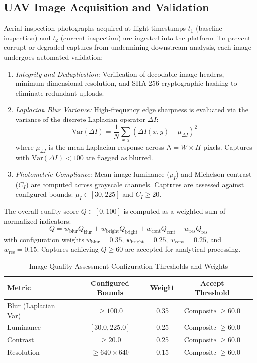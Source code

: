 \documentclass[conference]{IEEEtran}
\begin{document}
\subsection{UAV Image Acquisition and Validation}
Aerial inspection photographs acquired at flight timestamps $t_1$ (baseline inspection) and $t_2$ (current inspection) are ingested into the platform. To prevent corrupt or degraded captures from undermining downstream analysis, each image undergoes automated validation:
\begin{enumerate}
    \item \textit{Integrity and Deduplication:} Verification of decodable image headers, minimum dimensional resolution, and SHA-256 cryptographic hashing to eliminate redundant uploads.
    \item \textit{Laplacian Blur Variance:} High-frequency edge sharpness is evaluated via the variance of the discrete Laplacian operator $\Delta I$:
    \begin{equation}
        \text{Var}(\Delta I) = \frac{1}{N} \sum_{x,y} \left( \Delta I(x,y) - \mu_{\Delta I} \right)^2
        \label{eq:blur}
    \end{equation}
    where $\mu_{\Delta I}$ is the mean Laplacian response across $N = W \times H$ pixels. Captures with $\text{Var}(\Delta I) < 100$ are flagged as blurred.
    \item \textit{Photometric Compliance:} Mean image luminance ($\mu_I$) and Michelson contrast ($C_I$) are computed across grayscale channels. Captures are assessed against configured bounds: $\mu_I \in [30, 225]$ and $C_I \ge 20$.
\end{enumerate}

The overall quality score $Q \in [0, 100]$ is computed as a weighted sum of normalized indicators:
\begin{equation}
    Q = w_{\text{blur}} Q_{\text{blur}} + w_{\text{bright}} Q_{\text{bright}} + w_{\text{cont}} Q_{\text{cont}} + w_{\text{res}} Q_{\text{res}}
    \label{eq:quality}
\end{equation}
with configuration weights $w_{\text{blur}} = 0.35$, $w_{\text{bright}} = 0.25$, $w_{\text{cont}} = 0.25$, and $w_{\text{res}} = 0.15$. Captures achieving $Q \ge 60$ are accepted for analytical processing.

\begin{table}[htbp]
    \caption{Image Quality Assessment Configuration Thresholds and Weights}
    \label{tab:quality_cfg}
    \centering
    \begin{tabular}{lcccc}
        \toprule
        \textbf{Metric} & \textbf{Configured Bounds} & \textbf{Weight} & \textbf{Accept Threshold} \\
        \midrule
        Blur (Laplacian Var) & $\ge 100.0$ & 0.35 & Composite $\ge 60.0$ \\
        Luminance & $[30.0, 225.0]$ & 0.25 & Composite $\ge 60.0$ \\
        Contrast & $\ge 20.0$ & 0.25 & Composite $\ge 60.0$ \\
        Resolution & $\ge 640 \times 640$ & 0.15 & Composite $\ge 60.0$ \\
        \bottomrule
    \end{tabular}
\end{table}
\end{document}
